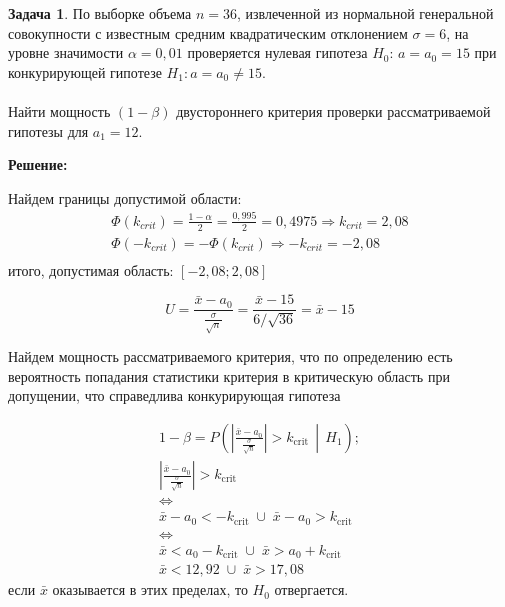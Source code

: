 \documentclass[a4paper,11pt]{article}
\newenvironment{shdd}{\begin{mdframed}[backgroundcolor=shadecolor]}{\end{mdframed}}
\theoremstyle{definition}
\newtheorem{problem}{Задача}\setlength{\parindent}{0pt}
\newenvironment{solution}
{\begin{shdd}
     \textbf{Решение:}\par\setlength{\parindent}{0pt}}
     {
\end{shdd}}
\begin{document}
    \newpage
    \begin{problem}
        По выборке объема \(n = 36\), извлеченной из нормальной генеральной совокупности
        с известным средним квадратическим отклонением \(\sigma = 6\), на уровне значимости
        \(\alpha = 0,01\) проверяется нулевая гипотеза \(H_0\):
        \(a = a_0 = 15\) при конкурирующей гипотезе \(H_1 : a = a_0 \neq 15\).
        \\
        \\
        Найти мощность \((1-\beta)\) двустороннего критерия проверки рассматриваемой гипотезы для \(a_1 = 12\).

        \begin{solution}
            Найдем границы допустимой области:
            \begin{gather*}
                \Phi(k_{crit}) = \frac{1 - \alpha}{2} = \frac{0,995}{2} = 0,4975 \Longrightarrow k_{crit} = 2,08\\
                \Phi(-k_{crit}) = -\Phi(k_{crit}) \Longrightarrow -k_{crit} = -2,08\\
            \end{gather*}
            итого, допустимая область: \([-2,08; 2,08]\)

            \[
                U = \frac{\bar{x} - a_0}{\frac{\sigma}{\sqrt {n}}} = \frac{\bar{x} - 15}{6/\sqrt{36}} = \bar{x} - 15
            \]

            Найдем мощность рассматриваемого критерия, что по определению есть вероятность
            попадания статистики критерия в критическую область при допущении, что справедлива
            конкурирующая гипотеза

            \begin{gather*}
                1 - \beta = P\left(\left| \frac{\bar{x} - a_0}{\frac{\sigma}{\sqrt{n}}} \right| > k_{\text{crit}} \,\middle|\, H_1\right); \\
                \left| \frac{\bar{x} - a_0}{\frac{\sigma}{\sqrt{n}}} \right| > k_{\text{crit}} \\
                \Leftrightarrow \\
                \bar{x} - a_0 < -k_{\text{crit}} \;\cup\; \bar{x} - a_0 > k_{\text{crit}} \\
                \Leftrightarrow \\
                \bar{x} < a_0 - k_{\text{crit}} \;\cup\; \bar{x} > a_0 + k_{\text{crit}} \\
                \bar{x} < 12,92 \;\cup\; \bar{x} > 17,08
            \end{gather*}
            если \(\bar{x}\) оказывается в этих пределах, то \(H_0\) отвергается.\\


\end{solution}
\end{problem}
\end{document}
